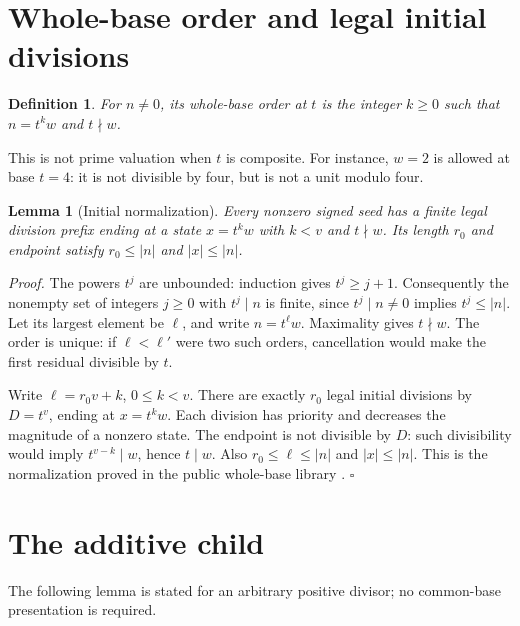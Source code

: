 \documentclass[11pt,letterpaper]{article}
\newtheorem{lemma}[theorem]{Lemma}
\newtheorem{definition}[theorem]{Definition}
\newenvironment{proof}{\noindent\textit{Proof.}}{\hfill\(\square\)}
\begin{document}
\section{Whole-base order and legal initial divisions}

\begin{definition}\label{Order}
For \(n\ne0\), its whole-base order at \(t\) is the integer \(k\ge0\)
such that \(n=t^k w\) and \(t\nmid w\).
\end{definition}

This is not prime valuation when \(t\) is composite. For instance, \(w=2\)
is allowed at base \(t=4\): it is not divisible by four, but is not a unit
modulo four.

\begin{lemma}[Initial normalization]\label{Normalize}
Every nonzero signed seed has a finite legal division prefix ending at a
state \(x=t^k w\) with \(k<v\) and \(t\nmid w\). Its length \(r_0\) and
endpoint satisfy \(r_0\le |n|\) and \(|x|\le |n|\).
\end{lemma}
\begin{proof}
The powers \(t^j\) are unbounded: induction gives \(t^j\ge j+1\).
Consequently the nonempty set of integers \(j\ge0\) with \(t^j\mid n\)
is finite, since \(t^j\mid n\ne0\) implies \(t^j\le |n|\). Let its largest
element be \(\ell\), and write \(n=t^\ell w\). Maximality gives \(t\nmid w\).
The order is unique: if \(\ell<\ell'\) were two such orders, cancellation
would make the first residual divisible by \(t\).

Write \(\ell=r_0v+k\), \(0\le k<v\). There are exactly \(r_0\) legal initial
divisions by \(D=t^v\), ending at \(x=t^k w\). Each division has priority and
decreases the magnitude of a nonzero state. The endpoint is not divisible
by \(D\): such divisibility would imply \(t^{v-k}\mid w\), hence \(t\mid w\).
Also \(r_0\le\ell\le |n|\) and \(|x|\le |n|\).
This is the normalization proved in the public whole-base library
\cite{AscendCommonBase}.
\end{proof}

\section{The additive child}

The following lemma is stated for an arbitrary positive divisor; no
common-base presentation is required.
\end{document}
